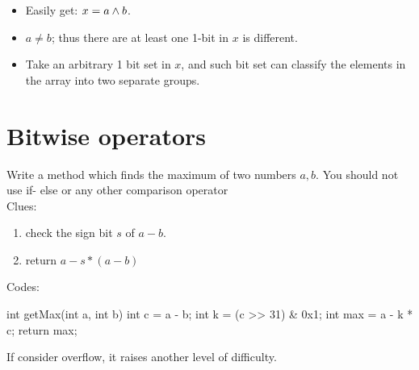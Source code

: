 \begin{itemize}
\item Easily get: $x = a \wedge b$.
\item $a \neq b$; thus there are at least one 1-bit in $x$ is different.  
\item Take an arbitrary 1 bit set in $x$, and such bit set can classify the elements in the array into two separate groups.
\end{itemize}

\section{Bitwise operators}
 Write a method which finds the maximum of two numbers $a, b$. You should not use if- else or any other comparison operator
\\
Clues:
\begin{enumerate}
\item check the sign bit $s$ of $a-b$.
\item return $a-s*(a-b)$
\end{enumerate}
Codes:
\begin{java}
int getMax(int a, int b) { 
    int c = a - b;
    int k = (c >> 31) & 0x1; 
    int max = a - k * c; 
    return max;
}

\end{java}
If consider overflow, it raises another level of difficulty. 
